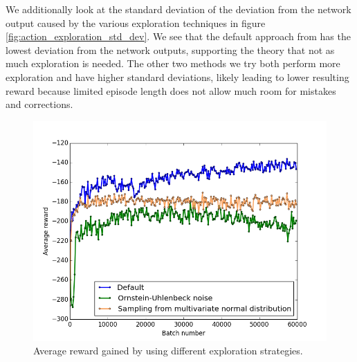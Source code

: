 \documentclass{article}
\begin{document}
We additionally look at the standard deviation of the deviation from the network output caused by the various exploration techniques in figure \ref{fig:action_exploration_std_dev}. We see that the default approach from \cite{maddpg} has the lowest deviation from the network outputs, supporting the theory that not as much exploration is needed. The other two methods we try both perform more exploration and have higher standard deviations, likely leading to lower resulting reward because  limited episode length does not allow much room for mistakes and corrections.

\begin{figure}
\begin{center}
\includegraphics[scale=0.35]{defaultVSouVSdist}
\end{center}
\caption{Average reward gained by using different exploration strategies.}
\label{fig:defaultVSouVSdist}
\end{figure}
\end{document}
